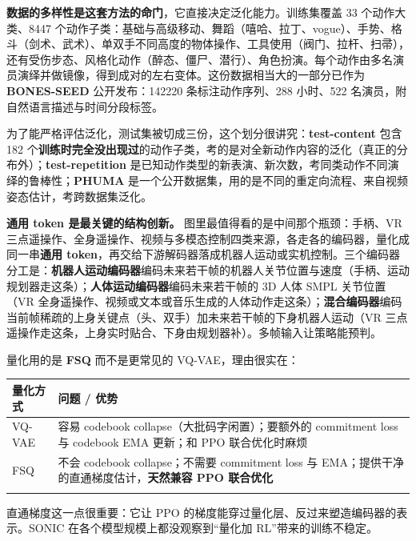 \documentclass[
  chinese,
]{ctexart}
\begin{document}
\textbf{数据的多样性是这套方法的命门}，它直接决定泛化能力。训练集覆盖 33
个动作大类、8447
个动作子类：基础与高级移动、舞蹈（嘻哈、拉丁、vogue）、手势、格斗（剑术、武术）、单双手不同高度的物体操作、工具使用（阀门、拉杆、扫帚），还有受伤步态、风格化动作（醉态、僵尸、潜行）、角色扮演。每个动作由多名演员演绎并做镜像，得到成对的左右变体。这份数据相当大的一部分已作为
\textbf{BONES-SEED} 公开发布：142220 条标注动作序列、288 小时、522
名演员，附自然语言描述与时间分段标签。

为了能严格评估泛化，测试集被切成三份，这个划分很讲究：\textbf{test-content}
包含 182
个\textbf{训练时完全没出现过}的动作子类，考的是对全新动作内容的泛化（真正的分布外）；\textbf{test-repetition}
是已知动作类型的新表演、新次数，考同类动作不同演绎的鲁棒性；\textbf{PHUMA}
是一个公开数据集，用的是不同的重定向流程、来自视频姿态估计，考跨数据集泛化。

\textbf{通用 token 是最关键的结构创新。}
图里最值得看的是中间那个瓶颈：手柄、VR
三点遥操作、全身遥操作、视频与多模态控制四类来源，各走各的编码器，量化成同一串\textbf{通用
token}，再交给下游解码器落成机器人运动或实机控制。三个编码器分工是：\textbf{机器人运动编码器}编码未来若干帧的机器人关节位置与速度（手柄、运动规划器走这条）；\textbf{人体运动编码器}编码未来若干帧的
3D 人体 SMPL 关节位置（VR
全身遥操作、视频或文本或音乐生成的人体动作走这条）；\textbf{混合编码器}编码当前帧稀疏的上身关键点（头、双手）加未来若干帧的下身机器人运动（VR
三点遥操作走这条，上身实时贴合、下身由规划器补）。多帧输入让策略能预判。

量化用的是 \textbf{FSQ} 而不是更常见的 VQ-VAE，理由很实在：

\begin{center}
\begin{tabular}{@{}>{\raggedright\arraybackslash}p{} >{\raggedright\arraybackslash}p{}@{}}
\toprule\noalign{}
量化方式 & 问题 / 优势 \\
\midrule\noalign{}
VQ-VAE & 容易 codebook collapse（大批码字闲置）；要额外的 commitment loss 与 codebook EMA 更新；和 PPO 联合优化时麻烦 \\
FSQ & 不会 codebook collapse；不需要 commitment loss 与 EMA；提供干净的直通梯度估计，\textbf{天然兼容 PPO 联合优化} \\
\bottomrule\noalign{}
\end{tabular}
\end{center}

直通梯度这一点很重要：它让 PPO
的梯度能穿过量化层、反过来塑造编码器的表示。SONIC
在各个模型规模上都没观察到``量化加 RL''带来的训练不稳定。
\end{document}
